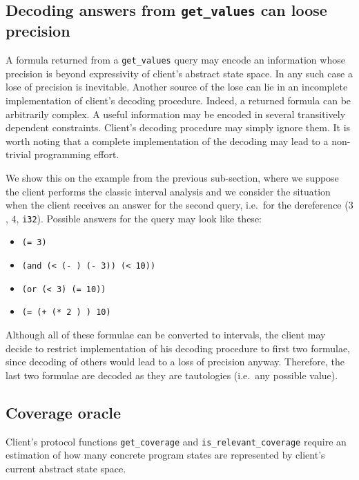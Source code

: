 \documentclass[envcountsame]{llncs}
\newcommand{\tmbraw}[3]{(\ensuremath{#1}, \ensuremath{#2}, \texttt{#3})}
\newcommand{\tmb}[3]{\tmbraw{#1}{#2}{#3}}
\begin{document}
\subsection{Decoding answers from {\tt get\_values} can loose precision}
\label{sec:DecodingGetValues}

A formula returned from a \texttt{get\_values} query may encode an information
whose precision is beyond expressivity of client's abstract state space. In any
such case a lose of precision is inevitable. Another source of the lose can lie
in an incomplete implementation of client's decoding procedure. Indeed, a
returned formula can be arbitrarily complex. A useful information may be encoded
in several transitively dependent constraints. Client's decoding procedure may
simply ignore them. It is worth noting that a complete implementation of the
decoding may lead to a non-trivial programming effort.

We show this on the example from the previous sub-section, where we suppose the
client performs the classic interval analysis and we consider the situation when
the client receives an answer for the second query, i.e.~for the dereference
\tmb{3}{4}{i32}. Possible answers for the query may look like these:
\begin{itemize}
\item \texttt{(=  3)}
\item \texttt{(and (< (- ) (- 3)) (<  10))}
\item \texttt{(or (<  3) (=  10))}
\item \texttt{(= (+ (* 2 ) ) 10)}
\end{itemize}
Although all of these formulae can be converted to intervals, the client may
decide to restrict implementation of his decoding procedure to first two
formulae, since decoding of others would lead to a loss of precision anyway.
Therefore, the last two formulae are decoded as they are tautologies (i.e.~any
possible value).


\subsection{Coverage oracle}
\label{sec:CoverageOracle}

Client's protocol functions \texttt{get\_coverage} and
\texttt{is\_relevant\_coverage} require an estimation of how many concrete
program states are represented by client's current abstract state space.
\end{document}
